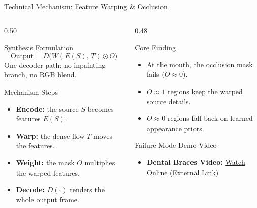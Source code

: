 \begin{frame}{Technical Mechanism: Feature Warping \& Occlusion}
    \begin{columns}[T]
        \begin{column}{0.50\textwidth}
            \begin{block}{Synthesis Formulation}
                \scriptsize
                $$\text{Output} = D\big(W(E(S),\, T) \odot O\big)$$
                One decoder path: no inpainting branch, no RGB blend.
            \end{block}
            
            \vspace{-0.15cm}
            \begin{block}{Mechanism Steps}
                \footnotesize
                \begin{itemize}
                    \item \textbf{Encode:} the source $S$ becomes features $E(S)$.
                    \item \textbf{Warp:} the dense flow $T$ moves the features.
                    \item \textbf{Weight:} the mask $O$ multiplies the warped features.
                    \item \textbf{Decode:} $D(\cdot)$ renders the whole output frame.
                \end{itemize}
            \end{block}
        \end{column}

        \begin{column}{0.48\textwidth}
            \begin{block}{Core Finding}
                \footnotesize
                \begin{itemize}
                    \item At the mouth, the occlusion mask fails ($O \approx 0$).
                    \item $O \approx 1$ regions keep the warped source details.
                    \item $O \approx 0$ regions fall back on learned appearance priors.
                \end{itemize}
            \end{block}

            \vspace{-0.1cm}
            \begin{block}{Failure Mode Demo Video}
                \scriptsize
                \begin{itemize}
                    \item \textbf{Dental Braces Video:} \href{https://youtu.be/TSRONFB7SBs}{\underline{\textcolor{primaryNavy}{Watch Online (External Link)}}}
                \end{itemize}
            \end{block}
        \end{column}
    \end{columns}
\end{frame}
